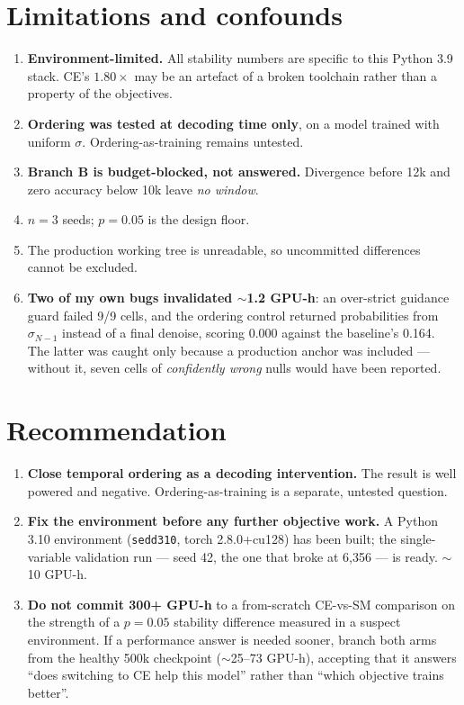 \documentclass[10pt,a4paper]{article}
\newcommand{\code}[1]{\texttt{\small #1}}
\begin{document}
\section{Limitations and confounds}
\begin{enumerate}\itemsep2pt
\item \textbf{Environment-limited.} All stability numbers are specific to this
Python 3.9 stack. CE's $1.80\times$ may be an artefact of a broken toolchain
rather than a property of the objectives.
\item \textbf{Ordering was tested at decoding time only}, on a model trained
with uniform $\sigma$. Ordering-as-training remains untested.
\item \textbf{Branch B is budget-blocked, not answered.} Divergence before 12k
and zero accuracy below 10k leave \emph{no window}.
\item $n{=}3$ seeds; $p{=}0.05$ is the design floor.
\item The production working tree is unreadable, so uncommitted differences
cannot be excluded.
\item \textbf{Two of my own bugs invalidated $\sim$1.2 GPU-h}: an over-strict
guidance guard failed 9/9 cells, and the ordering control returned
probabilities from $\sigma_{N-1}$ instead of a final denoise, scoring 0.000
against the baseline's 0.164. The latter was caught only because a production
anchor was included --- without it, seven cells of \emph{confidently wrong}
nulls would have been reported.
\end{enumerate}

\section{Recommendation}
\begin{enumerate}\itemsep2pt
\item \textbf{Close temporal ordering as a decoding intervention.} The result is
well powered and negative. Ordering-as-training is a separate, untested question.
\item \textbf{Fix the environment before any further objective work.} A Python
3.10 environment (\code{sedd310}, torch 2.8.0+cu128) has been built; the
single-variable validation run --- seed 42, the one that broke at 6{,}356 --- is
ready. $\sim$10 GPU-h.
\item \textbf{Do not commit 300+ GPU-h} to a from-scratch CE-vs-SM comparison on
the strength of a $p{=}0.05$ stability difference measured in a suspect
environment. If a performance answer is needed sooner, branch both arms from the
healthy 500k checkpoint ($\sim$25--73 GPU-h), accepting that it answers
``does switching to CE help this model'' rather than ``which objective trains
better''.
\end{enumerate}
\end{document}
